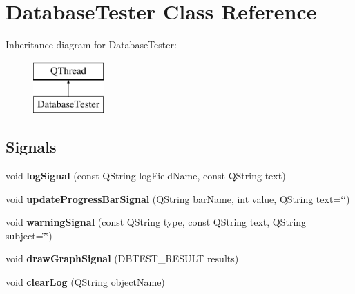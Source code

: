 \hypertarget{class_database_tester}{}\section{Database\+Tester Class Reference}
\label{class_database_tester}
Inheritance diagram for Database\+Tester\+:\begin{figure}[H]
\begin{center}
\leavevmode
\includegraphics[height=2.000000cm]{class_database_tester}
\end{center}
\end{figure}
\subsection*{Signals}
\begin{DoxyCompactItemize}
\item 
\mbox{\label{class_database_tester_ae8cdca9440017ac9e16a4adc562cddcb}} 
void {\bfseries log\+Signal} (const Q\+String log\+Field\+Name, const Q\+String text)
\item 
\mbox{\label{class_database_tester_a7b36550095d5a991d0bebbe5fa160a46}} 
void {\bfseries update\+Progress\+Bar\+Signal} (Q\+String bar\+Name, int value, Q\+String text=\char`\"{}\char`\"{})
\item 
\mbox{\label{class_database_tester_a7ae8993320d3ff35796331fdbe4c92bd}} 
void {\bfseries warning\+Signal} (const Q\+String type, const Q\+String text, Q\+String subject=\char`\"{}\char`\"{})
\item 
\mbox{\label{class_database_tester_a131a43a4e47cfe811055ba8dfc32218b}} 
void {\bfseries draw\+Graph\+Signal} (D\+B\+T\+E\+S\+T\+\_\+\+R\+E\+S\+U\+LT results)
\item 
\mbox{\label{class_database_tester_a5a757073279947592de3d887a3876935}} 
void {\bfseries clear\+Log} (Q\+String object\+Name)
\end{DoxyCompactItemize}
